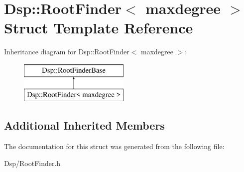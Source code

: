 \hypertarget{structDsp_1_1RootFinder}{\section{Dsp\-:\-:Root\-Finder$<$ maxdegree $>$ Struct Template Reference}
\label{structDsp_1_1RootFinder}
}
Inheritance diagram for Dsp\-:\-:Root\-Finder$<$ maxdegree $>$\-:\begin{figure}[H]
\begin{center}
\leavevmode
\includegraphics[height=2.000000cm]{structDsp_1_1RootFinder}
\end{center}
\end{figure}
\subsection*{Additional Inherited Members}


The documentation for this struct was generated from the following file\-:\begin{DoxyCompactItemize}
\item 
Dsp/Root\-Finder.\-h\end{DoxyCompactItemize}
